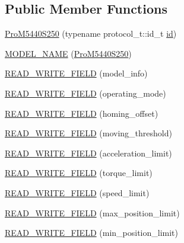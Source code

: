 \subsection*{Public Member Functions}
\begin{DoxyCompactItemize}
\item 
\hyperlink{classdynamixel_1_1servos_1_1_pro_m5440_s250_a9a68d1f3bef7fdd4fdfdb9530173c8bf}{Pro\+M5440\+S250} (typename protocol\+\_\+t\+::id\+\_\+t \hyperlink{classdynamixel_1_1servos_1_1_servo_a2d022081672e25a7bb57b76706e1cc57}{id})
\item 
\hyperlink{classdynamixel_1_1servos_1_1_pro_m5440_s250_a9cae65a7928935b4eb0cde4677eee289}{M\+O\+D\+E\+L\+\_\+\+N\+A\+ME} (\hyperlink{classdynamixel_1_1servos_1_1_pro_m5440_s250}{Pro\+M5440\+S250})
\item 
\hyperlink{classdynamixel_1_1servos_1_1_pro_m5440_s250_a16df9221b5d7c815ff0e4fb9b452ae09}{R\+E\+A\+D\+\_\+\+W\+R\+I\+T\+E\+\_\+\+F\+I\+E\+LD} (model\+\_\+info)
\item 
\hyperlink{classdynamixel_1_1servos_1_1_pro_m5440_s250_a1d9d9bdf804734f5b137be2871931d79}{R\+E\+A\+D\+\_\+\+W\+R\+I\+T\+E\+\_\+\+F\+I\+E\+LD} (operating\+\_\+mode)
\item 
\hyperlink{classdynamixel_1_1servos_1_1_pro_m5440_s250_a4ad29677d4e3bc7be07f2550e24a4360}{R\+E\+A\+D\+\_\+\+W\+R\+I\+T\+E\+\_\+\+F\+I\+E\+LD} (homing\+\_\+offset)
\item 
\hyperlink{classdynamixel_1_1servos_1_1_pro_m5440_s250_a2221ec6f843818ff7f7065e32971c9f9}{R\+E\+A\+D\+\_\+\+W\+R\+I\+T\+E\+\_\+\+F\+I\+E\+LD} (moving\+\_\+threshold)
\item 
\hyperlink{classdynamixel_1_1servos_1_1_pro_m5440_s250_a2b5c5504cc36c260b794c673b02e5842}{R\+E\+A\+D\+\_\+\+W\+R\+I\+T\+E\+\_\+\+F\+I\+E\+LD} (acceleration\+\_\+limit)
\item 
\hyperlink{classdynamixel_1_1servos_1_1_pro_m5440_s250_ac0bb0bba9cd94c6906a09cd53db898ec}{R\+E\+A\+D\+\_\+\+W\+R\+I\+T\+E\+\_\+\+F\+I\+E\+LD} (torque\+\_\+limit)
\item 
\hyperlink{classdynamixel_1_1servos_1_1_pro_m5440_s250_a047bc6b2923290b33e6283b620300087}{R\+E\+A\+D\+\_\+\+W\+R\+I\+T\+E\+\_\+\+F\+I\+E\+LD} (speed\+\_\+limit)
\item 
\hyperlink{classdynamixel_1_1servos_1_1_pro_m5440_s250_a1751f66974b39913971d3f1977a31bf0}{R\+E\+A\+D\+\_\+\+W\+R\+I\+T\+E\+\_\+\+F\+I\+E\+LD} (max\+\_\+position\+\_\+limit)
\item 
\hyperlink{classdynamixel_1_1servos_1_1_pro_m5440_s250_abdc9a5026f9a17741ac3a5870e263c91}{R\+E\+A\+D\+\_\+\+W\+R\+I\+T\+E\+\_\+\+F\+I\+E\+LD} (min\+\_\+position\+\_\+limit)

\end{DoxyCompactItemize}
